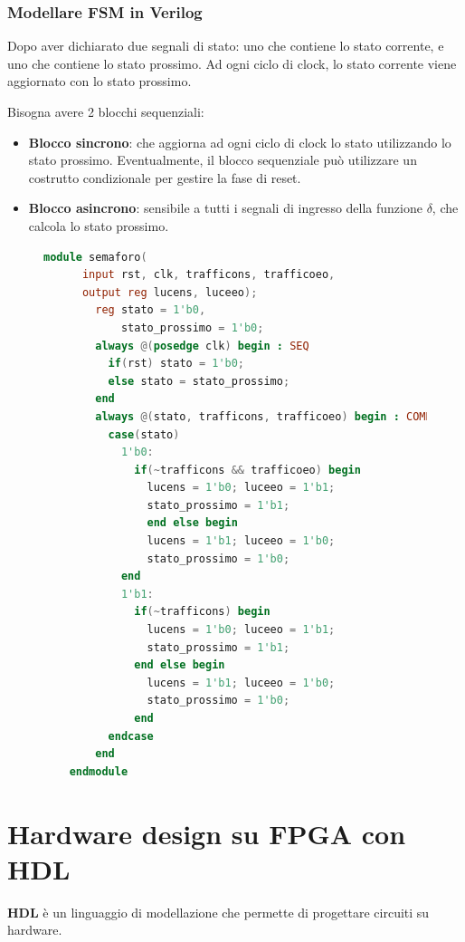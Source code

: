 \documentclass[a4paper]{article}
\theoremstyle{break}
\theoremstyle{break}
\theoremstyle{break}
\theoremstyle{break}
\begin{document}
\subsubsection{Modellare FSM in Verilog}
Dopo aver dichiarato due segnali di stato: uno che contiene lo stato
corrente, e uno che contiene lo stato prossimo. Ad ogni ciclo di clock, lo
stato corrente viene aggiornato con lo stato prossimo.

Bisogna avere 2 blocchi sequenziali:
\begin{itemize}
  \item \textbf{Blocco sincrono}: che aggiorna ad ogni ciclo di clock lo stato utilizzando
    lo stato prossimo. Eventualmente, il blocco sequenziale può utilizzare un
    costrutto condizionale per gestire la fase di reset.
  \item \textbf{Blocco asincrono}: sensibile a tutti i segnali di ingresso della funzione \( \delta \),
    che calcola lo stato prossimo.
\end{itemize}

\begin{figure}[H]
  \begin{lstlisting}[language=Verilog]
    module semaforo(
      input rst, clk, trafficons, trafficoeo,
      output reg lucens, luceeo);
        reg stato = 1'b0,
            stato_prossimo = 1'b0;
        always @(posedge clk) begin : SEQ
          if(rst) stato = 1'b0;
          else stato = stato_prossimo;
        end
        always @(stato, trafficons, trafficoeo) begin : COMB_OUT
          case(stato)
            1'b0:
              if(~trafficons && trafficoeo) begin
                lucens = 1'b0; luceeo = 1'b1;
                stato_prossimo = 1'b1;
                end else begin
                lucens = 1'b1; luceeo = 1'b0;
                stato_prossimo = 1'b0;
            end
            1'b1:
              if(~trafficons) begin
                lucens = 1'b0; luceeo = 1'b1;
                stato_prossimo = 1'b1;
              end else begin
                lucens = 1'b1; luceeo = 1'b0;
                stato_prossimo = 1'b0;
              end
          endcase
        end
    endmodule
  \end{lstlisting}
\end{figure}

\section{Hardware design su FPGA con HDL}
\textbf{HDL} è un linguaggio di modellazione che permette di progettare circuiti su hardware.
\end{document}
